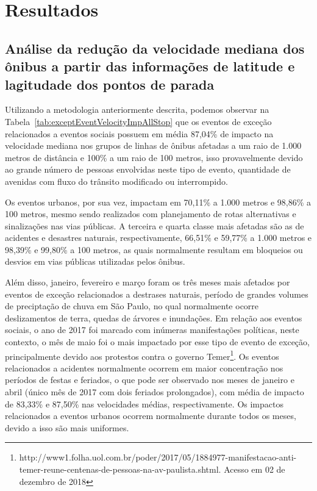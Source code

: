 \documentclass[
	12pt,				%
	oneside,			%
	a4paper,			%
	english,			%
	brazil				%
	]{abntex2ppgsi}
\begin{document}
{{{

\section*{Resultados}

\subsection*{Análise da redução da velocidade mediana dos ônibus a partir das informações de latitude e lagitudade dos pontos de parada}
\label{stopsAnalysis}

Utilizando a metodologia anteriormente descrita, podemos observar na Tabela~\ref{tab:exceptEventVelocityImpAllStop} que os eventos de exceção relacionados a eventos sociais possuem em média 87,04\% de impacto na velocidade mediana  nos grupos de linhas de ônibus afetadas a um raio de 1.000 metros de distância e 100\% a um raio de 100 metros, isso provavelmente devido ao grande número de pessoas envolvidas neste tipo de evento, quantidade de avenidas com fluxo do trânsito modificado ou interrompido.

Os eventos urbanos, por sua vez, impactam  em 70,11\% a 1.000 metros e 98,86\% a 100 metros, mesmo sendo realizados com planejamento de rotas alternativas e sinalizações nas vias públicas. A terceira e quarta classe mais afetadas são as de acidentes e desastres naturais, respectivamente, 66,51\% e 59,77\% a 1.000 metros e 98,39\% e 99,80\% a 100 metros, as quais normalmente resultam em bloqueios ou desvios em vias públicas utilizadas pelos ônibus.


Além disso, janeiro, fevereiro e março foram os três meses mais afetados por eventos de exceção relacionados a destrases naturais, período de grandes volumes de preciptação de chuva em São Paulo, no qual normalmente ocorre deslizamentos de terra, quedas de árvores e inundações.  Em relação aos eventos sociais, o ano de 2017 foi marcado com inúmeras manifestações políticas, neste contexto, o mês de maio foi o mais impactado por esse tipo de evento de exceção, principalmente devido aos protestos contra o governo Temer\footnote{{http://www1.folha.uol.com.br/poder/2017/05/1884977-manifestacao-anti-temer-reune-centenas-de-pessoas-na-av-paulista.shtml}. Acesso em 02 de dezembro de 2018}. Os eventos relacionados a acidentes normalmente ocorrem em maior concentração nos períodos de festas e feriados, o que pode ser observado nos meses de janeiro e abril (único mês de 2017 com dois feriados prolongados), com média de impacto de 83,33\% e 87,50\% nas velocidades médias, respectivamente.  Os impactos relacionados a eventos urbanos ocorrem normalmente durante todos os meses, devido a isso são mais uniformes.

}}}
\end{document}
